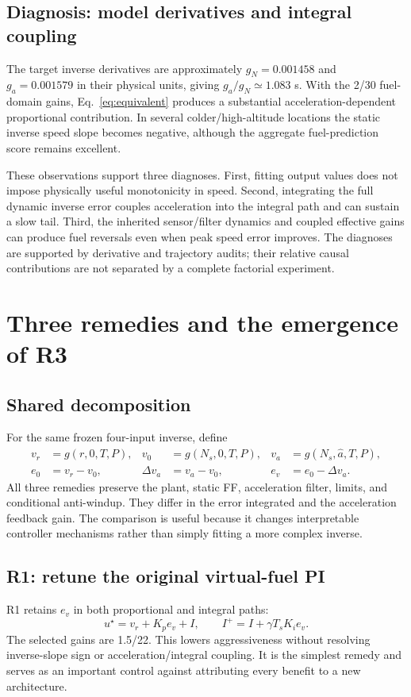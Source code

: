 \subsection{Diagnosis: model derivatives and integral coupling}
The target inverse derivatives are approximately $g_N=0.001458$ and $g_a=0.001579$ in their physical units, giving $g_a/g_N\simeq1.083$ s. With the 2/30 fuel-domain gains, Eq.~\eqref{eq:equivalent} produces a substantial acceleration-dependent proportional contribution. In several colder/high-altitude locations the static inverse speed slope becomes negative, although the aggregate fuel-prediction score remains excellent.


These observations support three diagnoses. First, fitting output values does not impose physically useful monotonicity in speed. Second, integrating the full dynamic inverse error couples acceleration into the integral path and can sustain a slow tail. Third, the inherited sensor/filter dynamics and coupled effective gains can produce fuel reversals even when peak speed error improves. The diagnoses are supported by derivative and trajectory audits; their relative causal contributions are not separated by a complete factorial experiment.




\section{Three remedies and the emergence of R3}
\subsection{Shared decomposition}
For the same frozen four-input inverse, define
\begin{align}
v_r&=g(r,0,T,P),&v_0&=g(N_s,0,T,P),&v_a&=g(N_s,\hat a,T,P),\\
e_0&=v_r-v_0,&\Delta v_a&=v_a-v_0,&e_v&=e_0-\Delta v_a.
\end{align}
All three remedies preserve the plant, static FF, acceleration filter, limits, and conditional anti-windup. They differ in the error integrated and the acceleration feedback gain. The comparison is useful because it changes interpretable controller mechanisms rather than simply fitting a more complex inverse.

\subsection{R1: retune the original virtual-fuel PI}
R1 retains $e_v$ in both proportional and integral paths:
\begin{equation}
u^\star=v_r+K_pe_v+I,\qquad I^+=I+\gamma T_sK_ie_v.
\end{equation}
The selected gains are 1.5/22. This lowers aggressiveness without resolving inverse-slope sign or acceleration/integral coupling. It is the simplest remedy and serves as an important control against attributing every benefit to a new architecture.

